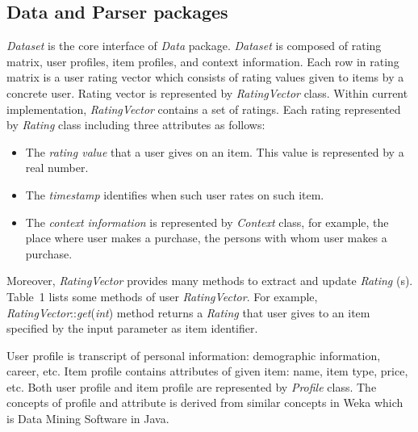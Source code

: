 \documentclass[a4paper]{llncs}
\begin{document}
\subsection{Data and Parser packages}
\label{subsec:data-parser-packages}
\textit{Dataset} is the core interface of \textit{Data} package. \textit{Dataset} is composed of rating matrix, user profiles, item profiles, and context information. Each row in rating matrix is a user rating vector which consists of rating values given to items by a concrete user. Rating vector is represented by \textit{RatingVector} class. Within current implementation, \textit{RatingVector} contains a set of ratings. Each rating represented by \textit{Rating} class including three attributes as follows:
\begin{itemize}
\item The \textit{rating value} that a user gives on an item. This value is represented by a real number.
\item The \textit{timestamp} identifies when such user rates on such item.
\item The \textit{context information} is represented by \textit{Context} class, for example, the place where user makes a purchase, the persons with whom user makes a purchase.
\end{itemize}
Moreover, \textit{RatingVector} provides many methods to extract and update \textit{Rating} (s). Table~1 lists some methods of user \textit{RatingVector}. For example, \textit{RatingVector}::\textit{get}(\textit{int}) method returns a \textit{Rating} that user gives to an item specified by the input parameter as item identifier.

User profile is transcript of personal information: demographic information, career, etc. Item profile contains attributes of given item: name, item type, price, etc. Both user profile and item profile are represented by \textit{Profile} class. The concepts of profile and attribute is derived from similar concepts in Weka \cite{waikato2008} which is Data Mining Software in Java.
\end{document}
